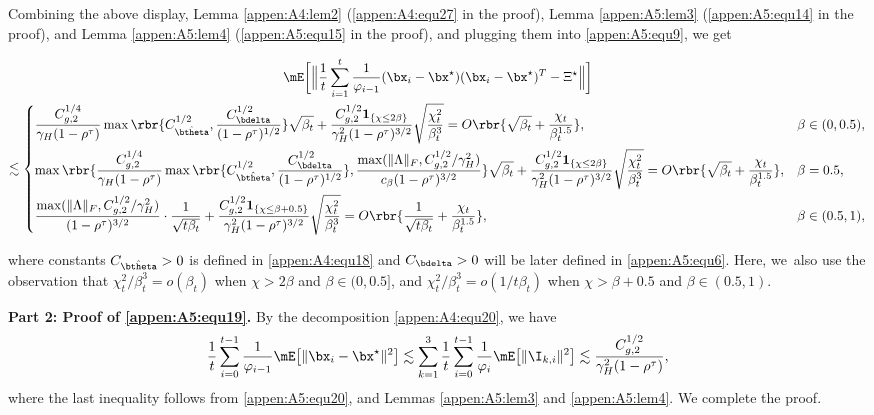 Combining the above display, Lemma \ref{appen:A4:lem2} (\eqref{appen:A4:equ27} in the proof), Lemma \ref{appen:A5:lem3} (\eqref{appen:A5:equ14} in the proof), and Lemma \ref{appen:A5:lem4} (\eqref{appen:A5:equ15} in the proof), and plugging them into \eqref{appen:A5:equ9}, we get
\begin{scriptsize}
\begin{multline}\label{appen:A5:equ16}
\mE\bigg[\Big\|\frac{1}{t}\sum_{i=1}^t\frac{1}{\varphi_{i-1}}(\bx_i-\bx^\star)(\bx_i-\bx^\star)^T-\Xi^\star\Big\|\bigg]\\
\lesssim \begin{dcases}
\frac{C_{g,2}^{1/4}}{\gamma_H(1-\rho^\tau)}\max \rbr{C_{\hat{\btheta}}^{1/2}, \frac{C_{\bdelta}^{1/2}}{(1-\rho^\tau)^{1/2}}}\sqrt{\beta_t} + \frac{C_{g,2}^{1/2}\mathbf{1}_{\{\chi\leq 2\beta\}}}{\gamma_H^2(1-\rho^\tau)^{3/2}}\sqrt{\frac{\chi_t^2}{\beta_t^{3}}} = O\rbr{\sqrt{\beta_t} + \frac{\chi_t}{\beta_t^{1.5}}}, &\beta\in(0,0.5),\\
\max\rbr{\frac{C_{g,2}^{1/4}}{\gamma_H(1-\rho^\tau)}\max\rbr{C_{\hat{\btheta}}^{1/2}, \frac{C_{\bdelta}^{1/2}}{(1-\rho^\tau)^{1/2}}}, \frac{\max(\|\Lambda\|_F, C_{g,2}^{1/2}/\gamma_H^2)}{c_{\beta}(1-\rho^\tau)^{3/2}}}\sqrt{\beta_t} + \frac{C_{g,2}^{1/2}\mathbf{1}_{\{\chi\leq 2\beta\}}}{\gamma_H^2(1-\rho^\tau)^{3/2}}\sqrt{\frac{\chi_t^2}{\beta_t^{3}}} = O\rbr{\sqrt{\beta_t} + \frac{\chi_t}{\beta_t^{1.5}}}, &\beta = 0.5,\\
\frac{\max(\|\Lambda\|_F, C_{g,2}^{1/2}/\gamma_H^2)}{(1-\rho^\tau)^{3/2}}\cdot\frac{1}{\sqrt{t\beta_t}} + \frac{C_{g,2}^{1/2}\mathbf{1}_{\{\chi\leq\beta+0.5\}}}{\gamma_H^2(1-\rho^\tau)^{3/2}}\sqrt{\frac{\chi_t^2}{\beta_t^{3}}}= O\rbr{\frac{1}{\sqrt{t\beta_t}} + \frac{\chi_t}{\beta_t^{1.5}}}, &\beta\in(0.5,1),
\end{dcases}
\end{multline}
\end{scriptsize}
\hskip-3.5pt where constants $C_{\hat{\btheta}}>0$ is defined in \eqref{appen:A4:equ18} and $C_{\bdelta}>0$ will be later defined in \eqref{appen:A5:equ6}. Here, we~also use the observation that $\chi_t^2/\beta_t^3 = o(\beta_t)$ when $\chi>2\beta$ and $\beta\in(0,0.5]$, and $\chi_t^2/\beta_t^3=o(1/t\beta_t)$ when $\chi>\beta+0.5$ and $\beta\in(0.5,1)$.

\vskip 0.3cm
\noindent \textbf{Part 2: Proof of \eqref{appen:A5:equ19}.} By the decomposition \eqref{appen:A4:equ20}, we have
\begin{equation}\label{appen:A5:equ21}
\frac{1}{t}\sum_{i=0}^{t-1}\frac{1}{\varphi_{i-1}}\mE\big[\|\bx_i-\bx^\star\|^2\big] \lesssim \sum_{k=1}^3 \frac{1}{t}\sum_{i=0}^{t-1} \frac{1}{\varphi_i} \mE\big[\|\I_{k,i}\|^2\big] \lesssim \frac{C_{g,2}^{1/2}}{\gamma_H^2(1-\rho^\tau)},
\end{equation}
where the last inequality follows from \eqref{appen:A5:equ20}, and Lemmas \ref{appen:A5:lem3} and \ref{appen:A5:lem4}. We complete the proof.



